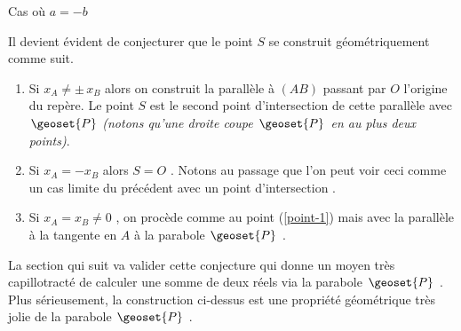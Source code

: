 \begin{center}
	\footnotesize
	\itshape

	
	\smallskip
	Cas où $a = -b$
\end{center}


\medskip

Il devient évident de conjecturer que le point $S$ se construit géométriquement comme suit.

\begin{enumerate}
	\item \label{point-1} Si $x_A \neq \pm \, x_B$ alors on construit la parallèle à $(AB)$ passant par $O$ l'origine du repère. Le point $S$ est le second point d'intersection de cette parallèle avec $\geoset{P}$  \emph{(notons qu'une droite coupe $\geoset{P}$ en au plus deux points)}.

	\item Si $x_A = - x_B$ alors $S = O$ . Notons au passage que l'on peut voir ceci comme un cas limite du précédent avec un point d'intersection .

	\item Si $x_A = x_B \neq 0$ , on procède comme au point (\ref{point-1}) mais avec la parallèle à la tangente en $A$ à la parabole $\geoset{P}$ .
\end{enumerate}


La section qui suit va valider cette conjecture qui donne un moyen très capillotracté de calculer une somme de deux réels via la parabole $\geoset{P}$ .
Plus sérieusement, la construction ci-dessus est une propriété géométrique très jolie de la parabole $\geoset{P}$ .
